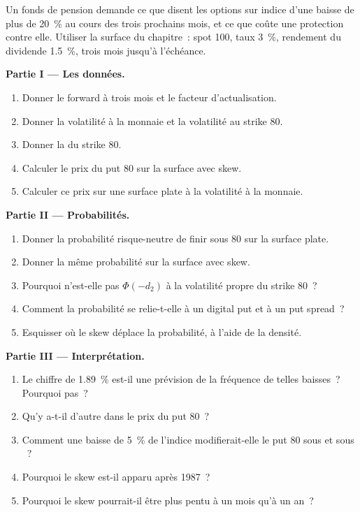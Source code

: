 \begin{problem}\label{pb:dv:implied-volatility-and-its-surface:1}
Un fonds de pension demande ce que disent les options sur indice d'une baisse de plus de 20~\% au cours des
trois prochains mois, et ce que coûte une protection contre elle. Utiliser la surface du chapitre~: spot 100,
taux 3~\%, rendement du dividende 1.5~\%, trois mois jusqu'à l'échéance.

\medskip\noindent\textbf{Partie I --- Les données.}
\begin{enumerate}
\item Donner le forward à trois mois et le facteur d'actualisation.
\item Donner la volatilité à la monnaie et la volatilité au strike 80.
\item Donner la  du strike 80.
\item Calculer le prix du put 80 sur la surface avec skew.
\item Calculer ce prix sur une surface plate à la volatilité à la monnaie.
\end{enumerate}

\medskip\noindent\textbf{Partie II --- Probabilités.}
\begin{enumerate}[resume]
\item Donner la probabilité risque-neutre de finir sous 80 sur la surface plate.
\item Donner la même probabilité sur la surface avec skew.
\item Pourquoi n'est-elle pas $\Phi(-d_2)$ à la volatilité propre du strike 80~?
\item Comment la probabilité se relie-t-elle à un digital put et à un put spread~?
\item Esquisser où le skew déplace la probabilité, à l'aide de la densité.
\end{enumerate}

\medskip\noindent\textbf{Partie III --- Interprétation.}
\begin{enumerate}[resume]
\item Le chiffre de 1.89~\% est-il une prévision de la fréquence de telles baisses~? Pourquoi pas~?
\item Qu'y a-t-il d'autre dans le prix du put 80~?
\item Comment une baisse de 5~\% de l'indice modifierait-elle le put 80 sous  et sous ~?
\item Pourquoi le skew est-il apparu après 1987~?
\item Pourquoi le skew pourrait-il être plus pentu à un mois qu'à un an~?
\end{enumerate}


\end{problem}

